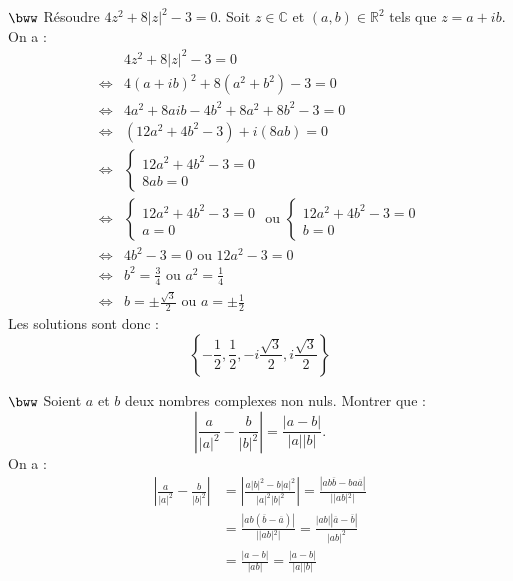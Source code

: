 \documentclass[11pt]{article}
\begin{document}
\begin{exercice}{$\bww$}{}
    Résoudre $4z^2 + 8|z|^2 - 3 = 0$.
    \tcblower
    Soit $z \in \mathbb{C}$ et $(a,b)\in\mathbb{R}^2$ tels que $z=a+ib$. On a :
    \begin{align*}
        &4z^2+8|z|^2-3=0\\
        \iff&4(a+ib)^2+8(a^2+b^2)-3=0\\
        \iff&4a^2+8aib-4b^2+8a^2+8b^2-3=0\\
        \iff&(12a^2+4b^2-3)+i(8ab) = 0\\
        \iff&\begin{cases}12a^2+4b^2-3=0\\8ab=0\end{cases}\\
        \iff&\begin{cases}12a^2+4b^2-3=0\\a=0\end{cases} \text{ ou } \begin{cases}12a^2+4b^2-3=0\\b=0\end{cases}\\
        \iff&4b^2-3=0 \text{ ou } 12a^2-3=0\\
        \iff&b^2=\frac{3}{4} \text{ ou } a^2 = \frac{1}{4}\\
        \iff&b=\pm\frac{\sqrt{3}}{2} \text{ ou } a=\pm\frac{1}{2}
    \end{align*}
    Les solutions sont donc :
    \begin{equation*}
        \left\{-\frac{1}{2}, \frac{1}{2}, -i\frac{\sqrt{3}}{2}, i\frac{\sqrt{3}}{2}\right\}
    \end{equation*}
\end{exercice}

\begin{exercice}{$\bww$}{}
    Soient $a$ et $b$ deux nombres complexes non nuls. Montrer que :
    \begin{equation*}
        \left|\frac{a}{|a|^2}-\frac{b}{|b|^2}\right|=\frac{|a-b|}{|a||b|}.
    \end{equation*}
    \tcblower
    On a : 
    \begin{align*}
        \left|\frac{a}{|a|^2}-\frac{b}{|b|^2}\right| &= \left|\frac{a|b|^2-b|a|^2}{|a|^2|b|^2}\right| = \frac{|ab\overline{b}-ba\overline{a}|}{||ab|^2|}\\
        &=\frac{\left|ab(\overline{b}-\overline{a})\right|}{||ab|^2|} =\frac{|ab||\overline{a}-\overline{b}|}{|ab|^2}\\
        &=\frac{|a-b|}{|ab|} = \frac{|a-b|}{|a||b|}
    \end{align*}
\end{exercice}
\end{document}
